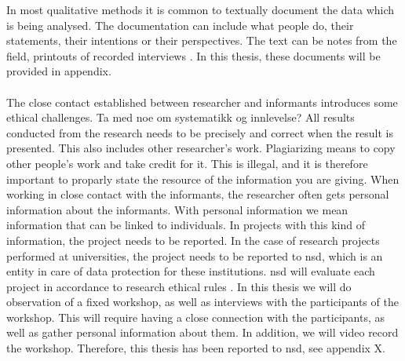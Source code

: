 In most qualitative methods it is common to textually document the data which is being analysed. The documentation can include what people do, their statements, their intentions or their perspectives. The text can be notes from the field, printouts of  recorded interviews \cite{qualitative}. In this thesis, these documents will be provided in appendix. \\ \\
The close contact established between researcher and informants introduces some ethical  challenges. Ta med noe om systematikk og innlevelse? All results conducted from the research needs to be precisely and correct when the result is presented. This also includes other researcher's work. Plagiarizing means to copy other people’s work and take credit for it. This is illegal, and it is therefore important to proparly state the resource of the information you are giving.  When working in close contact with the informants, the researcher often gets personal information about the informants. With personal information we mean information that can be linked to individuals. In projects with this kind of information, the project needs to be reported. In the case of research projects performed at universities, the project needs to be reported to \ac{nsd}, which is an entity in care of data protection for these institutions. \ac{nsd} will evaluate each project in accordance to research ethical rules \cite{qualitative}. In this thesis we will do observation of a fixed workshop, as well as interviews with the participants of the workshop. This will require having a close connection with the participants, as well as gather personal information about them. In addition, we will video record the workshop. Therefore, this thesis has been reported to \ac{nsd}, see appendix X. \\ \\
